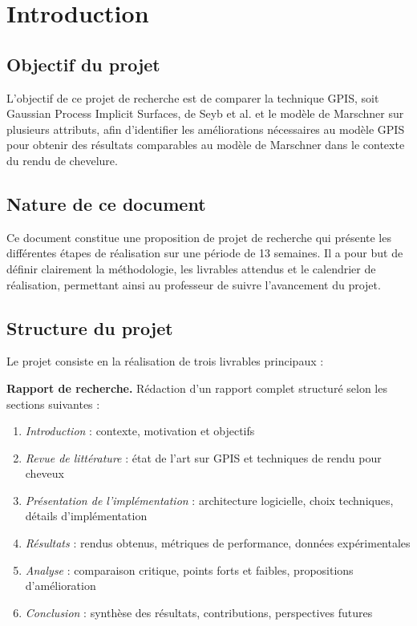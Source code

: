 \documentclass[12pt,a4paper,french]{article}
\begin{document}

\tableofcontents
\newpage

\section{Introduction}

\subsection{Objectif du projet}

L'objectif de ce projet de recherche est de comparer la technique GPIS, soit Gaussian Process Implicit Surfaces, de Seyb et al. \cite{seyb24from} et le modèle de Marschner \cite{marschner2003} sur plusieurs attributs, afin d'identifier les améliorations nécessaires au modèle GPIS pour obtenir des résultats comparables au modèle de Marschner dans le contexte du rendu de chevelure.

\subsection{Nature de ce document}

Ce document constitue une proposition de projet de recherche qui présente les différentes étapes de réalisation sur une période de 13 semaines. Il a pour but de définir clairement la méthodologie, les livrables attendus et le calendrier de réalisation, permettant ainsi au professeur de suivre l'avancement du projet.

\subsection{Structure du projet}

Le projet consiste en la réalisation de trois livrables principaux :

\textbf{Rapport de recherche.} Rédaction d'un rapport complet structuré selon les sections suivantes :
\begin{enumerate}[noitemsep]
    \item \textit{Introduction} : contexte, motivation et objectifs
    \item \textit{Revue de littérature} : état de l'art sur GPIS et techniques de rendu pour cheveux
    \item \textit{Présentation de l'implémentation} : architecture logicielle, choix techniques, détails d'implémentation
    \item \textit{Résultats} : rendus obtenus, métriques de performance, données expérimentales
    \item \textit{Analyse} : comparaison critique, points forts et faibles, propositions d'amélioration
    \item \textit{Conclusion} : synthèse des résultats, contributions, perspectives futures
\end{enumerate}
\end{document}
